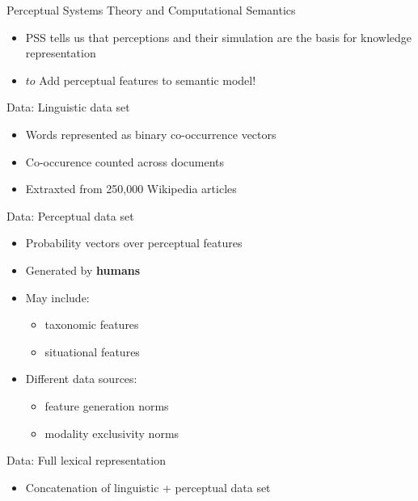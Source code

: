 \documentclass[12pt,a4paper]{beamer}
\begin{document}
\begin{frame}{Perceptual Systems Theory and Computational Semantics}
\begin{itemize}
\item PSS tells us that perceptions and their simulation are the basis for knowledge representation
\item $to$ Add perceptual features to semantic model!
\end{itemize}
\end{frame}



\begin{frame}{Data: Linguistic data set}
\begin{itemize}
\item Words represented as binary co-occurrence vectors
\item Co-occurence counted across documents
\item Extraxted from 250,000 Wikipedia articles
\end{itemize}
\end{frame}


\begin{frame}{Data: Perceptual data set}
\begin{itemize}
\item Probability vectors over perceptual features
\item Generated by \textbf{humans}
\item May include:
    \begin{itemize}
    \item taxonomic features
    \item situational features
    \end{itemize}
\item Different data sources:
    \begin{itemize}
    \item feature generation norms
    \item modality exclusivity norms
    \end{itemize}

\end{itemize}
\end{frame}

\begin{frame}{Data: Full lexical representation}
\begin{itemize}
\item Concatenation of linguistic + perceptual data set
\end{itemize}
\end{frame}
\end{document}
